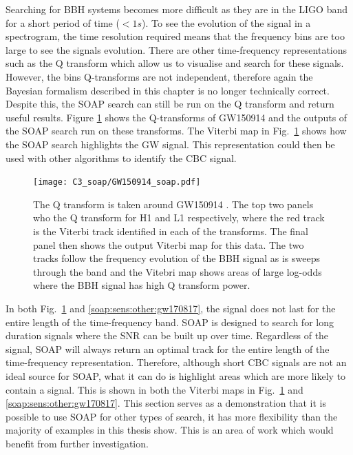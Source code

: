 Searching for \gls{BBH} systems becomes more difficult as they are in the \gls{LIGO} band for a short period of time ($ < 1 s$).
To see the evolution of the signal in a spectrogram, the time resolution required means that the frequency bins are too large to see the signals evolution.
There are other time-frequency representations such as the Q transform which allow us to visualise and search for these signals. However, the bins Q-transforms are not independent, therefore again the Bayesian formalism described in this chapter is no longer technically correct.
Despite this, the SOAP search can still be run on the Q transform and return useful results. 
Figure \ref{soap:sens:other:gw150914} shows the Q-transforms of GW150914 \citep{abbott2016ObservationGravitational} and the outputs of the SOAP search run on these transforms.
The Viterbi map in Fig.~\ref{soap:sens:other:gw150914} shows how the SOAP search highlights the \gls{GW} signal. 
This representation could then be used with other algorithms to identify the \gls{CBC} signal.
%
\begin{figure}[ht]
	\centering
	\texttt{[image: C3\_soap/GW150914\_soap.pdf]}
        \caption[SOAP search run on GW150914]{The Q transform is taken around GW150914 \citep{abbott2016ObservationGravitational}. The top two panels who the Q transform for H1 and L1 respectively, where the red track is the Viterbi track identified in each of the transforms. The final panel then shows the output Viterbi map for this data. The two tracks follow the frequency evolution of the \gls{BBH} signal as is sweeps through the band and the Vitebri map shows areas of large log-odds where the \gls{BBH} signal has high Q transform power.}
\label{soap:sens:other:gw150914}

\end{figure}
%

In both Fig.~\ref{soap:sens:other:gw150914} and \ref{soap:sens:other:gw170817}, the signal does not last for the entire length of the time-frequency band. 
SOAP is designed to search for long duration signals where the \gls{SNR} can be built up over time.
Regardless of the signal, SOAP will always return an optimal track for the entire length of the time-frequency representation. 
Therefore, although short \gls{CBC} signals are not an ideal source for SOAP, what it can do is highlight areas which are more likely to contain a signal. 
This is shown in both the Viterbi maps in Fig.~\ref{soap:sens:other:gw150914} and \ref{soap:sens:other:gw170817}.
This section serves as a demonstration that it is possible to use SOAP for other types of search, it has more flexibility than the majority of examples in this thesis show.
This is an area of work which would benefit from further
investigation.

